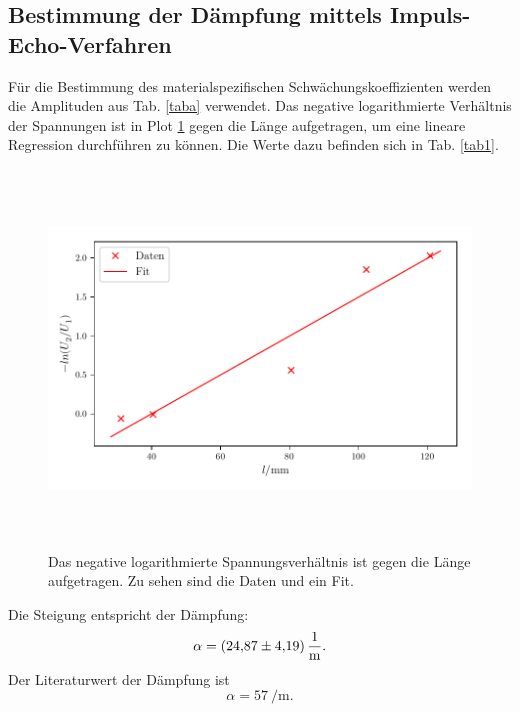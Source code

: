 \subsection{Bestimmung der Dämpfung mittels Impuls-Echo-Verfahren}
Für die Bestimmung des materialspezifischen Schwächungskoeffizienten werden
die Amplituden aus Tab. \ref{taba} verwendet.
Das negative logarithmierte Verhältnis der Spannungen ist in Plot \ref{fig:plot1}
gegen die Länge aufgetragen, um eine lineare Regression durchführen zu können. Die Werte dazu befinden sich in Tab. \ref{tab1}.

\begin{figure}
 \centering
 \includegraphics[width=15cm, height=10cm]{build/plot1.pdf}
 \caption{Das negative logarithmierte Spannungsverhältnis ist gegen die Länge aufgetragen.
 Zu sehen sind die Daten und ein Fit.}
 \label{fig:plot1}
\end{figure}
\noindent Die Steigung entspricht der Dämpfung:
\begin{equation*}
    \alpha = \SI{24.87 \pm 4.19}{\per\meter}.
\end{equation*}
\noindent Der Literaturwert der Dämpfung ist
\begin{equation*}
    \alpha = \SI{57}{\per\meter}.
\end{equation*}
